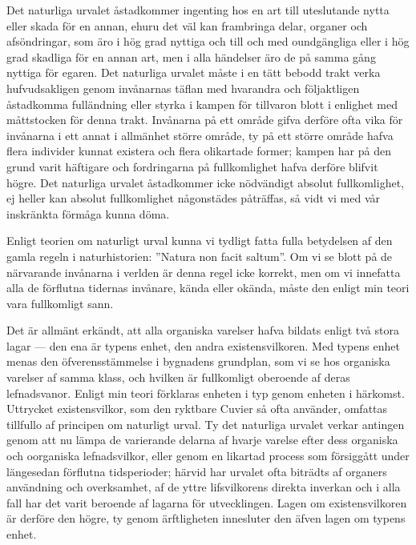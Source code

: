 Det naturliga urvalet åstadkommer ingenting hos en art till uteslutande nytta eller skada för en annan, ehuru det väl kan frambringa delar, organer och afsöndringar, som äro i hög grad nyttiga och till och med oundgängliga eller i hög grad skadliga för en annan art, men i alla händelser äro de på samma gång nyttiga för egaren. Det naturliga urvalet måste i en tätt bebodd trakt verka hufvudsakligen genom invånarnas täflan med hvarandra och följaktligen åstadkomma fulländning eller styrka i kampen för tillvaron blott i enlighet med måttstocken för denna trakt. Invånarna på ett område gifva derföre ofta vika för invånarna i ett annat i allmänhet större område, ty på ett större område hafva flera individer kunnat existera och flera olikartade former; kampen har på den grund varit häftigare och fordringarna på fullkomlighet hafva derföre blifvit högre. Det naturliga urvalet åstadkommer icke nödvändigt absolut fullkomlighet, ej heller kan absolut fullkomlighet någonstädes påträffas, så vidt vi med vår inskränkta förmåga kunna döma.

Enligt teorien om naturligt urval kunna vi tydligt fatta fulla betydelsen af den gamla regeln i naturhistorien: ”Natura non facit saltum”. Om vi se blott på de närvarande invånarna i verlden är denna regel icke korrekt, men om vi innefatta alla de förflutna tidernas invånare, kända eller okända, måste den enligt min teori vara fullkomligt sann.

Det är allmänt erkändt, att alla organiska varelser hafva bildats enligt två stora lagar — den ena är typens enhet, den andra existensvilkoren. Med typens enhet menas den öfverensstämmelse i bygnadens grundplan, som vi se hos organiska varelser af samma klass, och hvilken är fullkomligt oberoende af deras lefnadsvanor. Enligt min teori förklaras enheten i typ genom enheten i härkomst. Uttrycket existensvilkor, som den ryktbare Cuvier så ofta använder, omfattas tillfullo af principen om naturligt urval. Ty det naturliga urvalet verkar antingen genom att nu lämpa de varierande delarna af hvarje varelse efter dess organiska och oorganiska lefnadsvilkor, eller genom en likartad process som försiggått under längesedan förflutna tidsperioder; härvid har urvalet ofta biträdts af organers användning och overksamhet, af de yttre lifsvilkorens direkta inverkan och i alla fall har det varit beroende af lagarna för utvecklingen. Lagen om existensvilkoren är derföre den högre, ty genom ärftligheten innesluter den äfven lagen om typens enhet.


